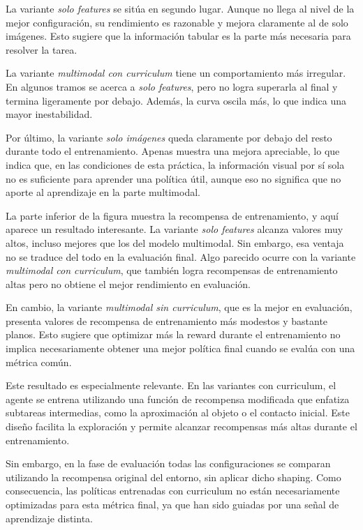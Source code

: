 \documentclass[10pt,twocolumn]{article}
\begin{document}
La variante \textit{solo features} se sitúa en segundo lugar. Aunque no llega al nivel de la mejor configuración, su rendimiento es razonable y mejora claramente al de solo imágenes. Esto sugiere que la información tabular es la parte más necesaria para resolver la tarea.

La variante \textit{multimodal con curriculum} tiene un comportamiento más irregular. En algunos tramos se acerca a \textit{solo features}, pero no logra superarla al final y termina ligeramente por debajo. Además, la curva oscila más, lo que indica una mayor inestabilidad.

Por último, la variante \textit{solo imágenes} queda claramente por debajo del resto durante todo el entrenamiento. Apenas muestra una mejora apreciable, lo que indica que, en las condiciones de esta práctica, la información visual por sí sola no es suficiente para aprender una política útil, aunque eso no significa que no aporte al aprendizaje en la parte multimodal.

La parte inferior de la figura muestra la recompensa de entrenamiento, y aquí aparece un resultado interesante. La variante \textit{solo features} alcanza valores muy altos, incluso mejores que los del modelo multimodal. Sin embargo, esa ventaja no se traduce del todo en la evaluación final. Algo parecido ocurre con la variante \textit{multimodal con curriculum}, que también logra recompensas de entrenamiento altas pero no obtiene el mejor rendimiento en evaluación.

En cambio, la variante \textit{multimodal sin curriculum}, que es la mejor en evaluación, presenta valores de recompensa de entrenamiento más modestos y bastante planos. Esto sugiere que optimizar más la reward durante el entrenamiento no implica necesariamente obtener una mejor política final cuando se evalúa con una métrica común.

Este resultado es especialmente relevante. En las variantes con curriculum, el agente se entrena utilizando una función de recompensa modificada que enfatiza subtareas intermedias, como la aproximación al objeto o el contacto inicial. Este diseño facilita la exploración y permite alcanzar recompensas más altas durante el entrenamiento.

Sin embargo, en la fase de evaluación todas las configuraciones se comparan utilizando la recompensa original del entorno, sin aplicar dicho shaping. Como consecuencia, las políticas entrenadas con curriculum no están necesariamente optimizadas para esta métrica final, ya que han sido guiadas por una señal de aprendizaje distinta.
\end{document}
